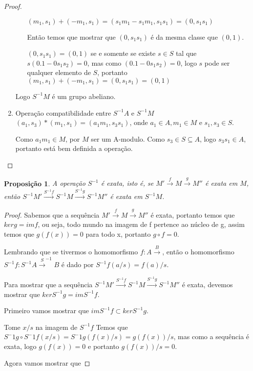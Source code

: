 \documentclass[10pt,a4paper]{article}
\newtheorem{proposition}[theorem]{Proposição}
\begin{document}
\begin{proof}
\begin{enumerate}
\begin{enumerate}
			$(m_1,s_1)+(-m_1,s_1)=(s_1m_1-s_1m_1, s_1s_1)=(0,s_1s_1)$
			
			Então temos que mostrar que $(0,s_1s_1)$ é da mesma classe que $(0,1)$.
			
			$(0,s_1s_1)=(0,1)$ se e somente se existe $s \in S$ tal que $s(0.1-0s_1s_2)=0$, mas como $(0.1-0s_1s_2)=0$, logo $s$ pode ser qualquer elemento de $S$, portanto $(m_1,s_1)+(-m_1,s_1)=(0,s_1s_1)=(0,1)$
		\end{enumerate}
		
		Logo $S^{-1}M$ é um grupo abeliano.
		
		\item Operação compatibilidade entre $S^{-1}A$ e $S^{-1}M$
		$(a_1,s_3)*(m_1,s_1)=(a_1m_1,s_3s_1)$, onde $a_1\in A, m_1 \in M$ e $s_1, s_3 \in S$.
		
		Como $a_1m_1 \in M$, por $M$ ser um A-modulo. Como  $s_3 \in S \subseteq A$, logo $s_3s_1 \in A$, portanto está bem definida a operação.
		
	\end{enumerate}
\end{proof}

\begin{proposition}
	A operação $S^{-1}$ é exata, isto é, se $M' \xrightarrow{f} M \xrightarrow{g}  M''$ é exata em $M$, então $S^{-1}M' \xrightarrow{S^{-1}f} S^{-1}M \xrightarrow{S^{-1}g}  S^{-1}M''$ é exata em $S^{-1}M$.
\end{proposition}
\begin{proof}
	Sabemos que a sequência $M' \xrightarrow{f} M \xrightarrow{g}  M''$ é exata, portanto temos que $ker g = im f$, ou seja, todo mundo na imagem de f pertence ao núcleo de g, assim temos que $g(f(x))=0$ para todo x, portanto $g \circ f = 0$.
	
	Lembrando que se tivermos o homomorfismo $f:A \xrightarrow B$, então o homomorfismo $S^{-1}f:S^{-1}A \xrightarrow S^{-1}B$ é dado por $S^{-1}f(a/s)=f(a)/s$.
	
	Para mostrar que a sequência $S^{-1}M' \xrightarrow{S^{-1}f} S^{-1}M \xrightarrow{S^{-1}g}  S^{-1}M''$ é exata, devemos mostrar que $ker S^{-1}g = im S^{-1}f$.
	
	Primeiro vamos mostrar que $im S^{-1}f \subset ker S^{-1}g$.
	
	Tome $x/s$ na imagem de $S^{-1}f$
	Temos que $S^-1g \circ S^-1f(x/s)=S^-1g(f(x)/s)=g(f(x))/s$, mas como a sequência é exata, logo $g(f(x))=0$ e portanto $g(f(x))/s=0$.
	
	Agora vamos mostrar que 
	
	
\end{proof}
\end{document}
